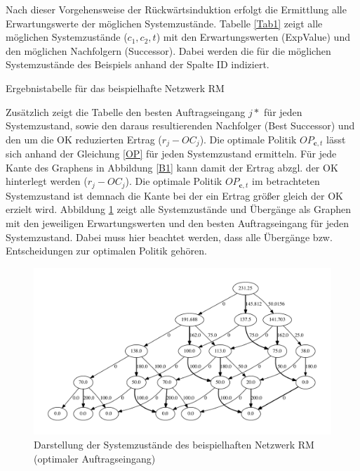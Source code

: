 Nach dieser Vorgehensweise der Rückwärtsinduktion erfolgt die Ermittlung alle Erwartungswerte der möglichen Systemzustände. Tabelle \ref{Tab1} zeigt alle möglichen Systemzustände ($c_1,c_2,t$) mit den Erwartungswerten (ExpValue) und den möglichen Nachfolgern (Successor). Dabei werden die für die möglichen Systemzustände des Beispiels anhand der Spalte ID indiziert. 
\begin{table}
\begin{footnotesize}
    \caption{Ergebnistabelle für das beispielhafte Netzwerk RM} \label{Tab1}
    \vspace*{3mm}
    \begin{center}
            \end{center}
\end{footnotesize}
\end{table}

Zusätzlich zeigt die Tabelle den besten Auftragseingang $j*$ für jeden Systemzustand, sowie den daraus resultierenden Nachfolger (Best Successor) und den um die OK reduzierten Ertrag ($r_j-OC_j$). Die optimale Politik $OP_{\textbf{c}, t}$ lässt sich anhand der Gleichung \eqref{OP} für jeden Systemzustand ermitteln. Für jede Kante des Graphens in Abbildung \ref{B1} kann damit der Ertrag abzgl. der OK hinterlegt werden ($r_{j}-OC_{j}$). Die optimale Politik $OP_{\textbf{c}, t}$ im betrachteten Systemzustand ist demnach die Kante bei der ein Ertrag größer gleich der OK erzielt wird. Abbildung \ref{B1a} zeigt alle Systemzustände und Übergänge als Graphen mit den jeweiligen Erwartungswerten und den besten Auftragseingang für jeden Systemzustand. Dabei muss hier beachtet werden, dass alle Übergänge bzw. Entscheidungen zur optimalen Politik gehören.
\begin{figure}[h!]
  \begin{center}
    \includegraphics[width=150mm]{Bilder/Beispiel1a.pdf}
    \caption{Darstellung der Systemzustände des beispielhaften Netzwerk RM (optimaler Auftragseingang)}  \label{B1a}
  \end{center}
\end{figure}

